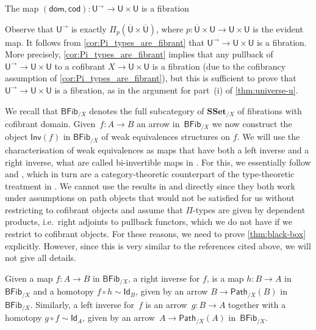 \documentclass[reqno,10pt,a4paper,oneside]{amsart}
\makeatletter
\renewenvironment{proof}[1][\proofname] {\par\pushQED{\qed}\normalfont\topsep6\p@\@plus6\p@\relax\trivlist\item[\hskip\labelsep\bf#1\@addpunct{.}]\ignorespaces}{\popQED\endtrivlist\@endpefalse}
\numberwithin{equation}{section}
\theoremstyle{mythm}
\theoremstyle{mydef}
\theoremstyle{myrmk}
\newcommand{\ie}{\text{i.e.\ }}
\newcommand{\co}{\colon}
\newcommand{\SSet}{\mathbf{SSet}}
\newcommand{\UU}{\overline{\mathsf{U}}}
\newcommand{\U}{\mathsf{U}}
\newcommand{\Iseq}{\mathsf{Inv}}
\newcommand{\Id}{\mathsf{Id}}
\newcommand{\BFFib}{\mathsf{BFib}}
\newcommand{\Path}{\mathsf{Path}}
\makeatother
\begin{document}
\begin{lemma} The map $(\mathsf{dom}, \mathsf{cod}) \co \U^{\rightarrow} \rightarrow \U \times \U$ is a fibration
\end{lemma}

\begin{proof} Observe that $\U^{\rightarrow}$ is exactly $\Pi_p(\UU \times \UU)$, 
where $p \co \UU \times \U \rightarrow \U \times \U$ is the evident map. 
It follows from \cref{cor:Pi_types_are_fibrant} that $\U^{\rightarrow} \rightarrow \U \times \U$ is a fibration.
More precisely, \cref{cor:Pi_types_are_fibrant} implies that any pullback of  $\U^{\rightarrow} \rightarrow \U \times \U$ to a cofibrant
$X \rightarrow \U \times \U$ is a fibration (due to the cofibrancy assumption of  \cref{cor:Pi_types_are_fibrant}),
but this is sufficient to prove that $\U^{\rightarrow} \rightarrow \U \times \U$ is a fibration,
as in the argument for part~(i) of  \cref{thm:universe-u}.
\end{proof}


We recall that $\BFFib_{/X}$ denotes the full subcategory of $\SSet_{/X}$ of fibrations with cofibrant domain. Given~$f \co A \to B$ an arrow in~$\BFFib_{/X}$ we now construct the object $\Iseq(f)$ in $\BFFib_{/X}$ of weak equivalences structures on $f$. We will use the 
characterisation of weak equivalences as maps that have both a left inverse and a right inverse, \ie what are called bi-invertible maps in \cite[Section 4.3]{hottbook}. 
For this, we essentially follow \cite{ShulmanM:unifid} and \cite[Section 1.4]{StenzelR:unirca}, which in turn are a category-theoretic counterpart of the type-theoretic
treatment in \cite{hottbook}. We cannot use the results in \cite{ShulmanM:unifid} and \cite[Section 1.4]{StenzelR:unirca} directly since they both work under 
assumptions on path objects that would not be satisfied for us without restricting to cofibrant objects and assume that $\Pi$-types are given by dependent products, {i.e.}~right adjoints to pullback functors, which we do not have if we restrict to cofibrant objects. For these reasons, we need to prove \cref{thm:black-box} explicitly. However, since this is very similar to the references cited above, we will not give all details.



Given a map $f \co A \to B$ in $\BFFib_{/X}$, a right inverse for $f$, is a map $h \co B \to A$ in $\BFFib_{/X}$ and a homotopy $f \circ h \sim \Id_B$, given by an arrow $B \to \Path_{/X}(B)$ in $\BFFib_{/X}$. Similarly, a left inverse for~$f$ is an arrow~$g \co B \to A$ together with a homotopy $g \circ f \sim \Id_A$, given by an arrow~$A \to \Path_{/X}(A)$ in~$\BFFib_{/X}$.
\end{document}
